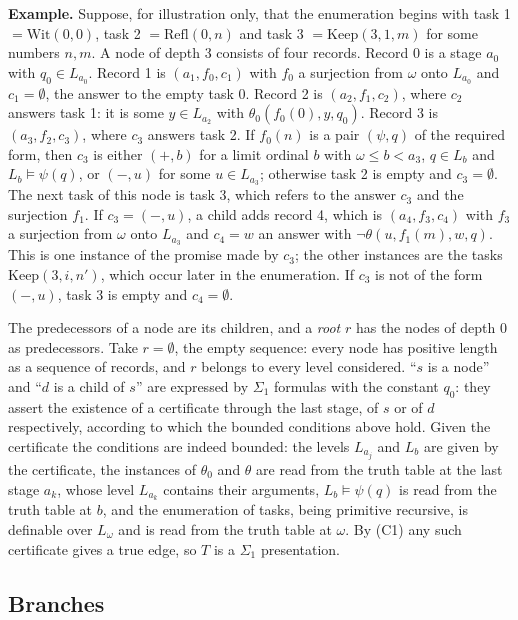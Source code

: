 \documentclass[11pt]{article}
\begin{document}
\textbf{Example.} Suppose, for illustration only, that the enumeration begins with task 1 $= \mathrm{Wit}(0, 0)$,
task 2 $= \mathrm{Refl}(0, n)$ and task 3 $= \mathrm{Keep}(3, 1, m)$ for some numbers $n, m$. A node of depth 3
consists of four records.
Record 0 is a stage $a_0$ with $q_0 \in L_{a_0}$. Record 1 is $(a_1, f_0, c_1)$ with $f_0$ a surjection from $\omega$
onto $L_{a_0}$ and $c_1 = \emptyset$, the answer to the empty task 0. Record 2 is $(a_2, f_1, c_2)$, where $c_2$
answers task 1: it is some $y \in L_{a_2}$ with $\theta_0(f_0(0), y, q_0)$. Record 3 is $(a_3, f_2, c_3)$, where $c_3$
answers task 2. If $f_0(n)$ is a pair $(\psi, q)$ of the required form, then $c_3$ is either $(+, b)$ for a limit
ordinal $b$ with $\omega \le b < a_3$, $q \in L_b$ and $L_b \models \psi(q)$, or $(-, u)$ for some $u \in L_{a_3}$;
otherwise task 2 is empty and $c_3 = \emptyset$. The next task of this node is task 3, which refers to the answer
$c_3$ and the surjection $f_1$. If $c_3 = (-, u)$, a child adds record 4, which is $(a_4, f_3, c_4)$ with $f_3$ a surjection from $\omega$ onto
$L_{a_3}$ and $c_4 = w$ an answer with $\neg\theta(u, f_1(m), w, q)$. This is one instance of the promise made by $c_3$; the other instances are the tasks
$\mathrm{Keep}(3, i, n')$, which occur later in the enumeration. If $c_3$ is not of the form $(-, u)$, task 3 is empty
and $c_4 = \emptyset$.

The predecessors of a node are its children, and a \emph{root} $r$ has the nodes of depth 0 as predecessors. Take
$r = \emptyset$, the empty sequence: every node has positive length as a sequence of records, and $r$ belongs to
every level considered. ``$s$
is a node'' and ``$d$ is a child of $s$'' are expressed by $\Sigma_1$ formulas with the constant $q_0$: they assert
the existence of a certificate through the last stage, of $s$ or of $d$ respectively, according to which the bounded
conditions above hold. Given the certificate the conditions are indeed bounded: the levels $L_{a_j}$ and $L_b$ are
given by the certificate, the instances of $\theta_0$ and $\theta$ are read from the truth table at the last stage $a_k$, whose level $L_{a_k}$
contains their arguments, $L_b \models \psi(q)$ is read from the truth table at $b$, and the enumeration of tasks, being
primitive recursive, is definable over $L_{\omega}$ and is read from the truth table at $\omega$. By (C1) any such
certificate gives a true edge, so $T$ is a $\Sigma_1$ presentation.

\subsection{Branches}
\end{document}
